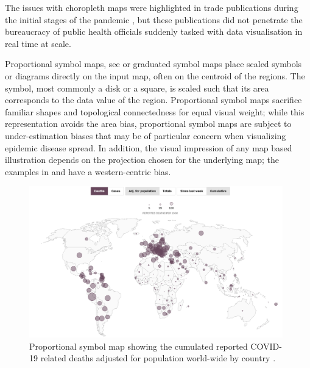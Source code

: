 \documentclass[article]{jdssv}\usepackage[]{graphicx}\usepackage[]{xcolor}
\begin{document}
The issues with choropleth maps were highlighted in trade publications during the initial stages of the pandemic \citep{fieldMappingCoronavirusResponsibly}, but these publications did not penetrate the bureaucracy of public health officials suddenly tasked with data visualisation in real time at scale. 

Proportional symbol maps, see  or graduated symbol maps place scaled symbols or diagrams directly on the input map, often on the centroid of the regions. 
The symbol, most commonly a disk or a square, is scaled such that its area corresponds to the data value of the region. 
Proportional symbol maps sacrifice familiar shapes and topological connectedness for equal visual weight\citep{gaoUsabilityValuebyalphaMaps2019}; while this representation avoids the area bias, proportional symbol maps are subject to under-estimation biases \citep{shimAnalysisMiddleSchool2008} that may be of particular concern when visualizing epidemic disease spread.
In addition, the visual impression of any map based illustration depends on the projection chosen for the underlying map; the examples in  and  have a western-centric bias.


\begin{figure}
	\includegraphics[width = 0.98\textwidth]{Figures_Web/wp_totaldeaths_propsymb.png}
	\caption{Proportional symbol map showing the cumulated reported COVID-19 related deaths adjusted for population world-wide by country \citep{alcantaraMappingWorldwideSpread}.}
	\label{fig:propsymb}
\end{figure}
\end{document}
